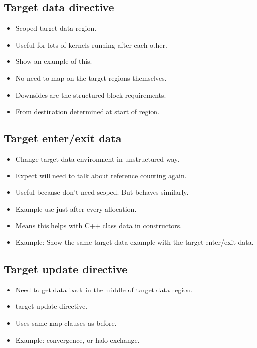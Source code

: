\subsection{Target data directive}
\begin{itemize}
  \item Scoped target data region.
  \item Useful for lots of kernels running after each other.
  \item Show an example of this.
  \item No need to map on the target regions themselves.
  \item Downsides are the structured block requirements.
  \item From destination determined at start of region.
\end{itemize}

\subsection{Target enter/exit data}
\begin{itemize}
  \item Change target data environment in unstructured way.
  \item Expect will need to talk about reference counting again.
  \item Useful because don't need scoped. But behaves similarly.
  \item Example use just after every allocation.
  \item Means this helps with C++ class data in constructors.
  \item Example: Show the same target data example with the target enter/exit data.
\end{itemize}

\subsection{Target update directive}
\begin{itemize}
  \item Need to get data back in the middle of target data region.
  \item target update directive.
  \item Uses same map clauses as before.
  \item Example: convergence, or halo exchange.
\end{itemize}

